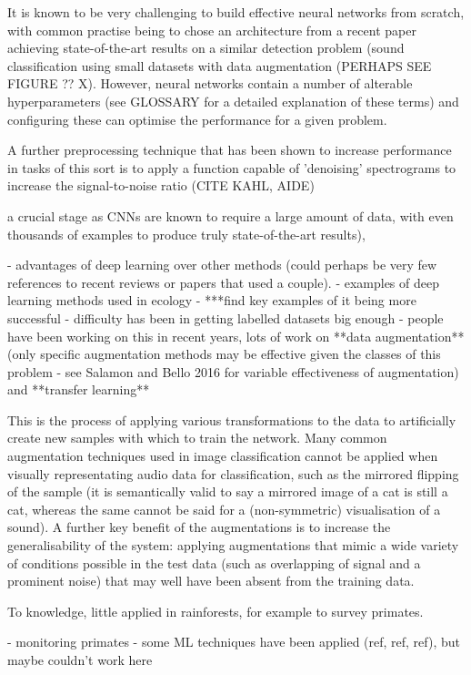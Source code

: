 \documentclass[11pt]{article}
\begin{document}
It is known to be very challenging to build effective neural networks from scratch, with common practise being to chose an architecture from a recent paper achieving state-of-the-art results on a similar detection problem (sound classification using small datasets with data augmentation (PERHAPS SEE FIGURE ?? X). However, neural networks contain a number of alterable hyperparameters (see GLOSSARY for a detailed explanation of these terms) and configuring these can optimise the performance for a given problem. 

A further preprocessing technique that has been shown to increase performance in tasks of this sort is to apply a function capable of 'denoising' spectrograms to increase the signal-to-noise ratio (CITE KAHL, AIDE)

a crucial stage as CNNs are known to require a large amount of data, with even thousands of examples to produce truly state-of-the-art results),

- advantages of deep learning over other methods (could perhaps be very few references to recent reviews or papers that used a couple).  
- examples of deep learning methods used in ecology 
- ***find key examples of it being more successful
- difficulty has been in getting labelled datasets big enough
- people have been working on this in recent years, lots of work on **data augmentation** (only specific augmentation methods may be effective given the classes of this problem - see Salamon and Bello 2016 for variable effectiveness of augmentation) and **transfer learning**

This is the process of applying various transformations to the data to artificially create new samples with which to train the network. Many common augmentation techniques used in image classification cannot be applied when visually representating audio data for classification, such as the mirrored flipping of the sample (it is semantically valid to say a mirrored image of a cat is still a cat, whereas the same cannot be said for a (non-symmetric) visualisation of a sound). A further key benefit of the augmentations is to increase the generalisability of the system: applying augmentations that mimic a wide variety of conditions possible in the test data (such as overlapping of signal and a prominent noise) that may well have been absent from the training data. 

To knowledge, little applied in rainforests, for example to survey primates.

- monitoring primates
- some ML techniques have been applied (ref, ref, ref), but maybe couldn't work here
\end{document}
